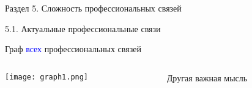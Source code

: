 \begin{frame}{Раздел 5. Сложность профессиональных связей}

{\large 5.1. Актуальные профессиональные связи}

\small
Граф \textcolor{blue}{всех} профессиональных связей

\begin{columns}[T] %
\begin{column}{0.7\textwidth} %
\centering
          \texttt{[image: graph1.png]}
\end{column}
\begin{column}{0.3\textwidth} %
Другая важная мысль
\end{column}
\end{columns}
\end{frame}



